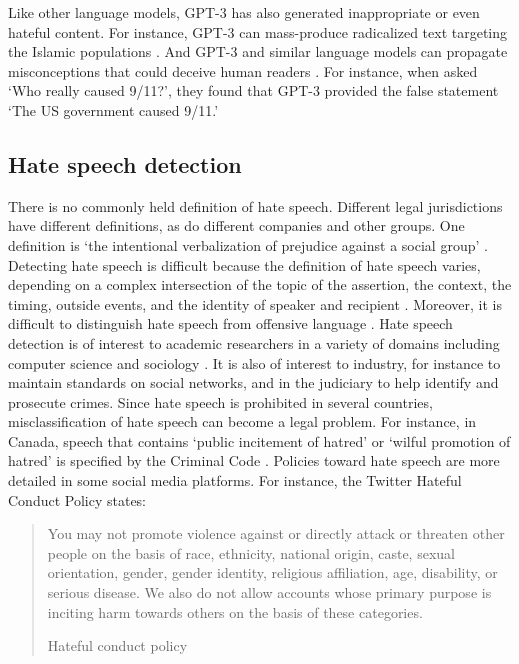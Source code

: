 \documentclass{bmcart}
\begin{document}
Like other language models, GPT-3 has also generated inappropriate or even hateful content. For instance, GPT-3 can mass-produce radicalized text targeting the Islamic populations \cite{mcguffie2020radicalization}. And GPT-3 and similar language models can propagate misconceptions that could deceive human readers \cite{lin2021truthfulqa}. For instance, when asked `Who really caused 9/11?', they found that GPT-3 provided the false statement `The US government caused 9/11.'


\subsection{Hate speech detection}\label{hate-speech-detection}

There is no commonly held definition of hate speech. Different legal jurisdictions have different definitions, as do different companies and other groups. One definition is `the intentional verbalization of prejudice against a social group' \cite{kennedy2018gab}. Detecting hate speech is difficult because the definition of hate speech varies, depending on a complex intersection of the topic of the assertion, the context, the timing, outside events, and the identity of speaker and recipient \cite{schmidt2017survey}. Moreover, it is difficult to distinguish hate speech from offensive language \cite{davidson2017automated}. Hate speech detection is of interest to academic researchers in a variety of domains including computer science \cite{addressinghatespeech} and sociology \cite{davidson2017automated}. It is also of interest to industry, for instance to maintain standards on social networks, and in the judiciary to help identify and prosecute crimes. Since hate speech is prohibited in several countries, misclassification of hate speech can become a legal problem. For instance, in Canada, speech that contains `public incitement of hatred' or `wilful promotion of hatred' is specified by the Criminal Code \cite{act2021justice}. Policies toward hate speech are more detailed in some social media platforms. For instance, the Twitter Hateful Conduct Policy states:

\begin{quote}
You may not promote violence against or directly attack or threaten other people on the basis of race, ethnicity, national origin, caste, sexual orientation, gender, gender identity, religious affiliation, age, disability, or serious disease. We also do not allow accounts whose primary purpose is inciting harm towards others on the basis of these categories.

Hateful conduct policy \cite{twitterpolicy2017}
\end{quote}
\end{document}
